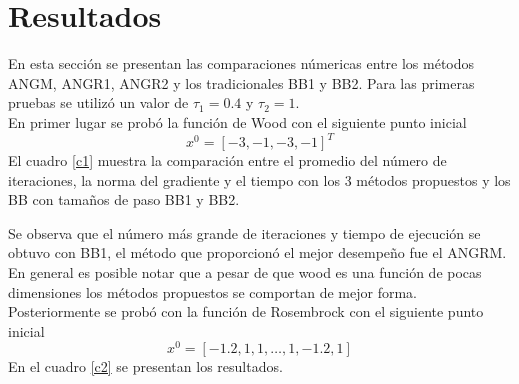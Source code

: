 \documentclass[conference]{IEEEtran}
\begin{document}
    \section{Resultados}
    En esta sección se presentan las comparaciones númericas entre los métodos ANGM, ANGR1, ANGR2 y los tradicionales BB1 y BB2.  Para las primeras pruebas se utilizó un valor de $\tau_1= 0.4$ y $\tau_2 = 1$.\\
    En primer lugar se probó la función de Wood con el siguiente punto inicial
    $$x^0 = [-3,-1,-3,-1]^T$$
    El cuadro \ref{c1} muestra la comparación entre el promedio del número de iteraciones, la norma del gradiente y el tiempo con los 3 métodos propuestos y los BB con tamaños de paso BB1 y BB2.
    \begin{table}[H]
    \centering
    \caption{Resultados promedio de 100 ejecuciones de los métodos con la Función Wood}
    \label{c1}
    \end{table}
    Se observa que el número más grande de iteraciones y tiempo de ejecución se obtuvo con BB1, el método que proporcionó el mejor desempeño fue el ANGRM. En general es posible notar que a pesar de que wood es una función de pocas dimensiones los métodos propuestos se comportan de mejor forma.\\
    Posteriormente se probó con la función de Rosembrock con el siguiente punto inicial
    $$x^0 = [-1.2,1,1, \hdots, 1,-1.2,1]$$
    En el cuadro \ref{c2} se presentan los resultados.
\end{document}

